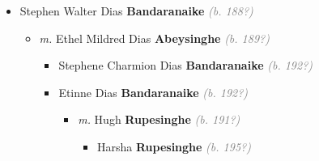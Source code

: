 \documentclass[10pt, openany]{book}
\begin{document}
\begin{itemize}
{\begin{itemize}
{\begin{itemize}
{\begin{itemize}
{\begin{itemize}
{\begin{itemize}
{\begin{itemize}
{\begin{itemize}
\item{Chantal \textbf{Obeyesekere} \textcolor{gray}{\textit{(b. 195?)}}
\begin{itemize}
\item{\textit{m.} Dijen \textbf{De Saram} \textcolor{gray}{\textit{(b. 195?)}}   \label{couple:00001496:00001497} \begin{itemize}
\item{Devan \textbf{De Saram} \textcolor{gray}{\textit{(b. 198?)}}
  }
\item{Chiara \textbf{De Saram} \textcolor{gray}{\textit{(b. 198?)}}
  }
\end{itemize}}
\end{itemize}
 }
\item{James Peter IV \textbf{Obeyesekere} \textcolor{gray}{\textit{(b. 195?)}}
   }
\end{itemize}}
\end{itemize}
   }
\end{itemize}}
\end{itemize}
   }
\item{Stephen Walter Dias \textbf{Bandaranaike} \textcolor{gray}{\textit{(b. 188?)}}
\begin{itemize}
\item{\textit{m.} Ethel Mildred Dias \textbf{Abeysinghe} \textcolor{gray}{\textit{(b. 189?)}}   \label{couple:00001498:00001499} \begin{itemize}
\item{Stephene Charmion Dias \textbf{Bandaranaike} \textcolor{gray}{\textit{(b. 192?)}}
   }
\item{Etinne Dias \textbf{Bandaranaike} \textcolor{gray}{\textit{(b. 192?)}}
\begin{itemize}
\item{\textit{m.} Hugh \textbf{Rupesinghe} \textcolor{gray}{\textit{(b. 191?)}}   \label{couple:00001512:00001513} \begin{itemize}
\item{Harsha \textbf{Rupesinghe} \textcolor{gray}{\textit{(b. 195?)}}
 }
\end{itemize}}
\end{itemize}
  }

\end{itemize}}
\end{itemize}}
\end{itemize}}
\end{itemize}}
\end{itemize}}
\end{itemize}
\end{document}
